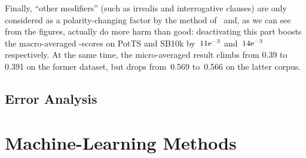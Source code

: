 Finally, ``other modifiers'' (such as irrealis and interrogative
clauses) are only considered as a polarity-changing factor by the
method of~\citet{Taboada:11} and, as we can see from the figures,
actually do more harm than good: deactivating this part boosts the
macro-averaged \F{}-scores on PotTS and SB10k by~${11}\mathrm{e}^{-3}$
and~${14}\mathrm{e}^{-3}$ respectively.  At the same time, the
micro-averaged result climbs from 0.39 to 0.391 on the former dataset,
but drops from~0.569 to~0.566 on the latter corpus.

\subsection{Error Analysis}\label{subsec:cgsa:lex-methods:err-analysis}









\section{Machine-Learning Methods}\label{sec:cgsa:ml-based}

